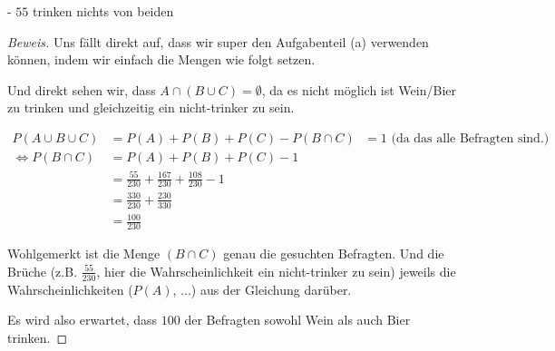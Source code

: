 \documentclass[10pt]{article}
\begin{document}
- $55$ trinken nichts von beiden
\begin{proof}[Beweis]
Uns fällt direkt auf, dass wir super den Aufgabenteil (a) verwenden können, indem wir einfach die Mengen wie folgt setzen.

\indent {}

\indent {}

\indent {}

Und direkt sehen wir, dass $A \cap (B \cup C) = \emptyset$, da es nicht möglich ist Wein/Bier zu trinken und gleichzeitig ein nicht-trinker zu sein.

\begin{align*}
P(A \cup B \cup C) &= P(A) + P(B) + P(C) - P(B \cap C) \text{ $= 1$ (da das alle Befragten sind.)} \\
\Leftrightarrow P(B \cap C) &= P(A) + P(B) + P(C) - 1 \\
&= \frac{55}{230} + \frac{167}{230} + \frac{108}{230} - 1 \\
&= \frac{330}{230} + \frac{230}{330} \\
&= \frac{100}{230}
\end{align*}

Wohlgemerkt ist die Menge $(B \cap C)$ genau die gesuchten Befragten. Und die Brüche (z.B. $\frac{55}{230}$, hier die Wahrscheinlichkeit ein nicht-trinker zu sein) jeweils die Wahrscheinlichkeiten ($P(A)$, ...) aus der Gleichung darüber.

Es wird also erwartet, dass $100$ der Befragten sowohl Wein als auch Bier trinken.
\end{proof}
\end{document}
